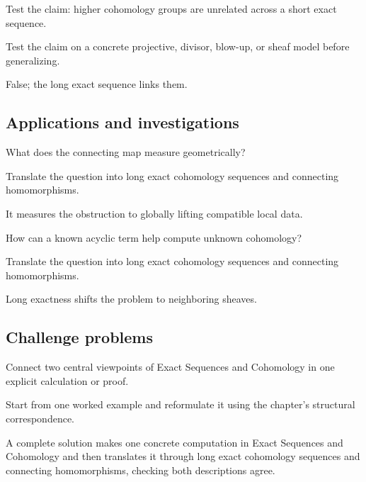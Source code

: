 \begin{exercise}\label{exr:vi48-expand-12}
Test the claim: higher cohomology groups are unrelated across a short exact sequence.
\end{exercise}
\begin{hint}
Test the claim on a concrete projective, divisor, blow-up, or sheaf model before generalizing.
\end{hint}
\begin{solution}
False; the long exact sequence links them.
\end{solution}

\subsection*{Applications and investigations}

\begin{exercise}[Obstructions]\label{exr:vi48-expand-13}
What does the connecting map measure geometrically?
\end{exercise}
\begin{hint}
Translate the question into long exact cohomology sequences and connecting homomorphisms.
\end{hint}
\begin{solution}
It measures the obstruction to globally lifting compatible local data.
\end{solution}

\begin{exercise}[Computations]\label{exr:vi48-expand-14}
How can a known acyclic term help compute unknown cohomology?
\end{exercise}
\begin{hint}
Translate the question into long exact cohomology sequences and connecting homomorphisms.
\end{hint}
\begin{solution}
Long exactness shifts the problem to neighboring sheaves.
\end{solution}

\subsection*{Challenge problems}

\begin{exercise}\label{exr:vi48-expand-15}
Connect two central viewpoints of Exact Sequences and Cohomology in one explicit calculation or proof.
\end{exercise}
\begin{hint}
Start from one worked example and reformulate it using the chapter's structural correspondence.
\end{hint}
\begin{solution}
A complete solution makes one concrete computation in Exact Sequences and Cohomology and then translates it through long exact cohomology sequences and connecting homomorphisms, checking both descriptions agree.
\end{solution}

